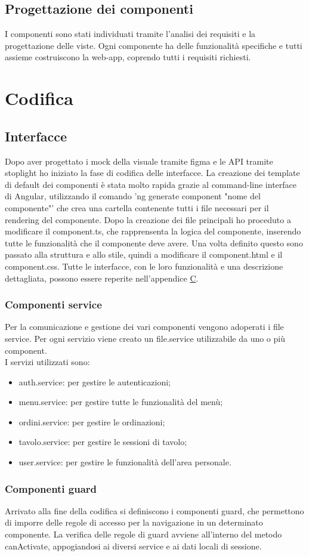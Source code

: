 \subsection{Progettazione dei componenti}
I componenti sono stati individuati tramite l'analisi dei requisiti e la progettazione delle viste. Ogni componente ha delle funzionalità specifiche e tutti assieme costruiscono la web-app, coprendo tutti i requisiti richiesti.
\\
\section{Codifica}
\subsection{Interfacce}
Dopo aver progettato i mock della visuale tramite figma e le API tramite stoplight ho iniziato la fase di codifica delle interfacce. La creazione dei template di default dei componenti è stata molto rapida grazie al command-line interface di Angular, utilizzando il comando 'ng generate component "nome del componente"' che crea una cartella contenente tutti i file necessari per il rendering del componente. Dopo la creazione dei file principali ho proceduto a modificare il component.ts, che rapprensenta la logica del componente, inserendo tutte le funzionalità che il componente deve avere. Una volta definito questo sono passato alla struttura e allo stile, quindi a modificare il component.html e il component.css.
Tutte le interfacce, con le loro funzionalità e una descrizione dettagliata, possono essere reperite nell'appendice {\hyperref[cap:appendice c]{C}}.
\subsubsection{Componenti service}
Per la comunicazione e gestione dei vari componenti vengono adoperati i file service. Per ogni servizio viene creato un file.service utilizzabile da uno o più component.\\
I servizi utilizzati sono:
\begin{itemize}
    \item auth.service: per gestire le autenticazioni;
    \item menu.service: per gestire tutte le funzionalità del menù;
    \item ordini.service: per gestire le ordinazioni;
    \item tavolo.service: per gestire le sessioni di tavolo;
    \item user.service: per gestire le funzionalità dell'area personale.
\end{itemize}
\subsubsection{Componenti guard}
Arrivato alla fine della codifica si definiscono i componenti guard, che permettono di imporre delle regole di accesso per la navigazione in un determinato componente. La verifica delle regole di guard avviene all'interno del metodo canActivate, appogiandosi ai diversi service e ai dati locali di sessione.
